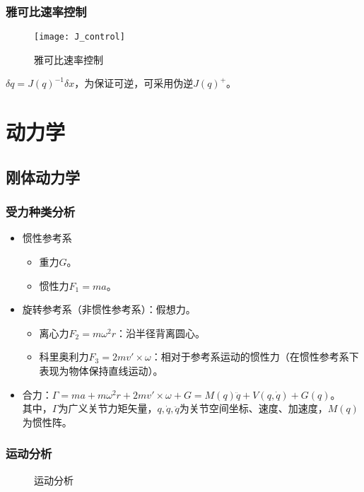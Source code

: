 \documentclass[
12pt, %
a4paper, 
oneside, %
headinclude,footinclude, %
]{scrartcl}
\begin{document}
\subsubsection{雅可比速率控制}
\begin{figure}[H]
\centering 
\texttt{[image: J\_control]} 
\caption[雅可比速率控制]{雅可比速率控制}
\end{figure}

$ \delta q = J(q)^{-1} \delta x $，为保证可逆，可采用伪逆$ J(q)^+ $。
\section{动力学}
\subsection{刚体动力学}
\subsubsection{受力种类分析}
\begin{itemize}
\item 惯性参考系
\begin{itemize}
\item 重力$ G $。
\item 惯性力$ F_1 = ma $。
\end{itemize} 
\item 旋转参考系（非惯性参考系）：假想力。
\begin{itemize}
\item 离心力$ F_2 = m\omega^2r $：沿半径背离圆心。
\item 科里奥利力$ F_3 = 2mv' \times \omega $：相对于参考系运动的惯性力（在惯性参考系下表现为物体保持直线运动）。
\end{itemize} 
\item 合力：$ \Gamma = ma + m\omega^2r + 2mv' \times \omega + G = M(q)\ddot{q} + V(q, \dot{q}) + G(q) $。 \\
其中，$ \Gamma $为广义关节力矩矢量，$ q,\dot{q},\ddot{q} $为关节空间坐标、速度、加速度，$ M(q) $为惯性阵。
\end{itemize} 
\subsubsection{运动分析}
\begin{figure}[H]
\centering
{} \quad
{} \quad
{} \quad
{}
\caption[运动分析]{运动分析}
\end{figure}
\end{document}
